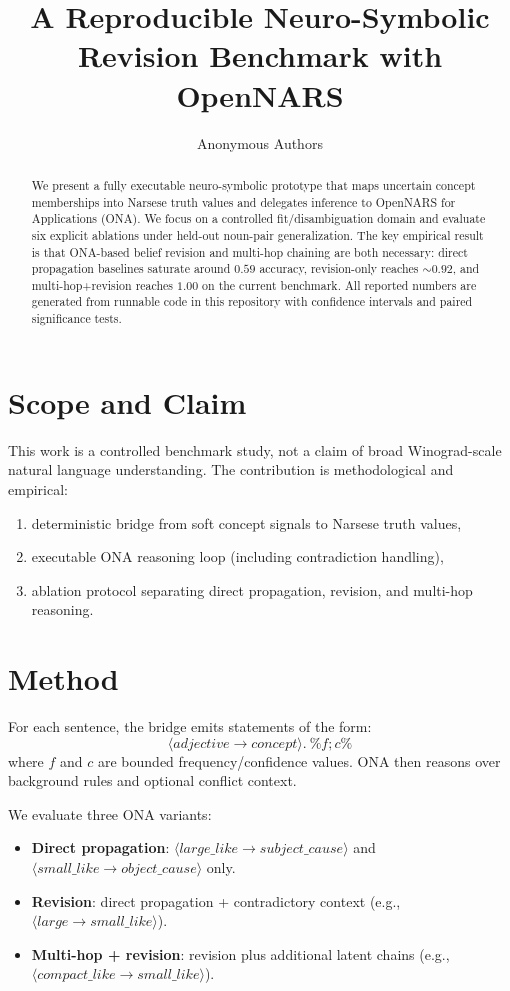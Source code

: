 \documentclass{article}
\title{A Reproducible Neuro-Symbolic Revision Benchmark with OpenNARS}
\author{
  Anonymous Authors
}
\begin{document}
\maketitle

\begin{abstract}
We present a fully executable neuro-symbolic prototype that maps uncertain concept memberships into Narsese truth values and delegates inference to OpenNARS for Applications (ONA). We focus on a controlled fit/disambiguation domain and evaluate six explicit ablations under held-out noun-pair generalization. The key empirical result is that ONA-based belief revision and multi-hop chaining are both necessary: direct propagation baselines saturate around $0.59$ accuracy, revision-only reaches $\sim0.92$, and multi-hop+revision reaches $1.00$ on the current benchmark. All reported numbers are generated from runnable code in this repository with confidence intervals and paired significance tests.
\end{abstract}

\section{Scope and Claim}
This work is a controlled benchmark study, not a claim of broad Winograd-scale natural language understanding. The contribution is methodological and empirical:
\begin{enumerate}
    \item deterministic bridge from soft concept signals to Narsese truth values,
    \item executable ONA reasoning loop (including contradiction handling),
    \item ablation protocol separating direct propagation, revision, and multi-hop reasoning.
\end{enumerate}

\section{Method}
For each sentence, the bridge emits statements of the form:
\[
\langle adjective \rightarrow concept \rangle.\ \%f;c\%
\]
where $f$ and $c$ are bounded frequency/confidence values. ONA then reasons over background rules and optional conflict context.

We evaluate three ONA variants:
\begin{itemize}
    \item \textbf{Direct propagation}: $\langle large\_like \rightarrow subject\_cause \rangle$ and $\langle small\_like \rightarrow object\_cause \rangle$ only.
    \item \textbf{Revision}: direct propagation + contradictory context (e.g., $\langle large \rightarrow small\_like \rangle$).
    \item \textbf{Multi-hop + revision}: revision plus additional latent chains (e.g., $\langle compact\_like \rightarrow small\_like \rangle$).
\end{itemize}
\end{document}
